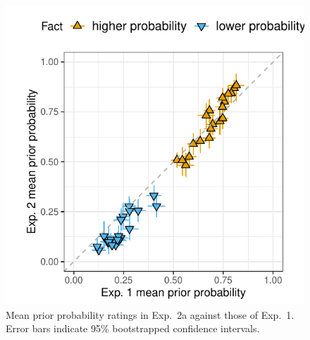 \documentclass[11pt,fleqn]{article}
\newcommand{\6}{\mbox{$[\hspace*{-.6mm}[$}}
\newcommand{\9}{\mbox{$]\hspace*{-.6mm}]$}}
\begin{document}
\begin{figure}[h!]
\centering

\includegraphics[width=.5\paperwidth]{../../results/1-prior/graphs/prior-probability-comparison-exp1-exp2}

\caption{Mean prior probability ratings in Exp.~2a against those of Exp.~1. Error bars indicate 95\% bootstrapped confidence intervals.}
\label{f-prior-comparison}
\end{figure}
\end{document}
